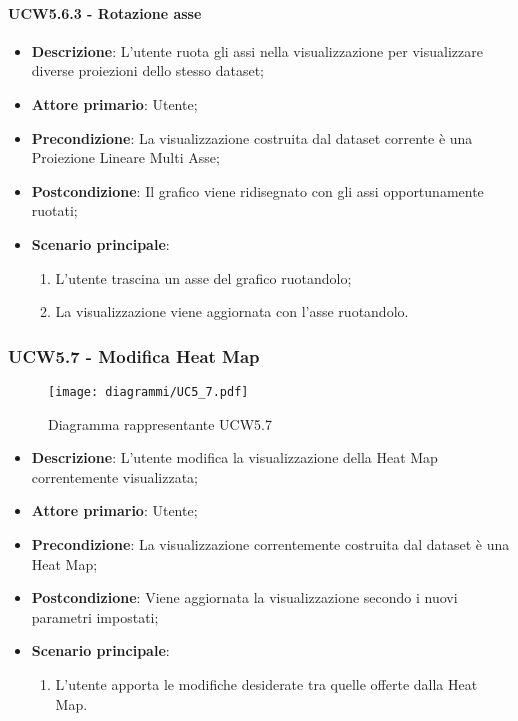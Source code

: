\paragraph{UCW5.6.3 - Rotazione asse}
\label{par:ucw5.6.3}
\begin{itemize}
    \item \textbf{Descrizione}: L'utente ruota gli assi nella visualizzazione per visualizzare diverse proiezioni dello stesso dataset;
    \item \textbf{Attore primario}: Utente;
    \item \textbf{Precondizione}: La visualizzazione costruita dal dataset corrente è una Proiezione Lineare Multi Asse;
    \item \textbf{Postcondizione}: Il grafico viene ridisegnato con gli assi opportunamente ruotati;
    \item \textbf{Scenario principale}:
          \begin{enumerate}
              \item L'utente trascina un asse del grafico ruotandolo;
              \item La visualizzazione viene aggiornata con l'asse ruotandolo.
          \end{enumerate}
\end{itemize}

\newpage

\subsubsection{UCW5.7 - Modifica Heat Map}
\label{ssub:ucw5.7}
\begin{figure}[h]
    \centering
    \texttt{[image: diagrammi/UC5\_7.pdf]}
    \caption{Diagramma rappresentante UCW5.7}
    \label{fig:UCW5.7}
\end{figure}


\begin{itemize}
    \item \textbf{Descrizione}: L’utente modifica la visualizzazione della Heat Map correntemente visualizzata;

    \item \textbf{Attore primario}: Utente;

    \item \textbf{Precondizione}:   La visualizzazione correntemente costruita dal dataset è una Heat Map;

    \item \textbf{Postcondizione}:  Viene aggiornata la visualizzazione secondo i nuovi parametri impostati;

    \item \textbf{Scenario principale}:
          \begin{enumerate}
              \item L'utente apporta le modifiche desiderate tra quelle offerte dalla Heat Map.
          \end{enumerate}
\end{itemize}

